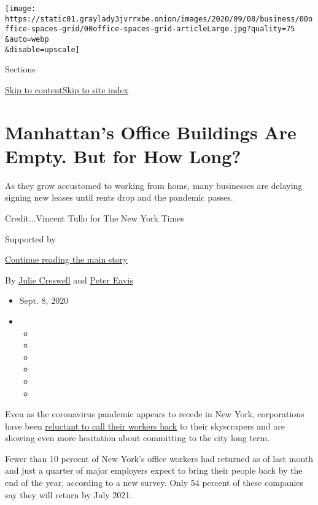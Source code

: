 \texttt{[image: https://static01.graylady3jvrrxbe.onion/images/2020/09/08/business/00office-spaces-grid/00office-spaces-grid-articleLarge.jpg?quality=75\\\&auto=webp\\\&disable=upscale]}

Sections

\protect\hyperlink{site-content}{Skip to
content}\protect\hyperlink{site-index}{Skip to site index}

\hypertarget{manhattans-office-buildings-are-empty-but-for-how-long}{%
\section{Manhattan's Office Buildings Are Empty. But for How
Long?}\label{manhattans-office-buildings-are-empty-but-for-how-long}}

As they grow accustomed to working from home, many businesses are
delaying signing new leases until rents drop and the pandemic passes.

Credit...Vincent Tullo for The New York Times

Supported by

\protect\hyperlink{after-sponsor}{Continue reading the main story}

By \href{https://www.nytimes3xbfgragh.onion/by/julie-creswell}{Julie
Creswell} and
\href{https://www.nytimes3xbfgragh.onion/by/peter-eavis}{Peter Eavis}

\begin{itemize}
\item
  Sept. 8, 2020
\item
  \begin{itemize}
  \item
  \item
  \item
  \item
  \item
  \item
  \end{itemize}
\end{itemize}

Even as the coronavirus pandemic appears to recede in New York,
corporations have been
\href{https://www.nytimes3xbfgragh.onion/2020/06/22/nyregion/nyc-phase-2-reopening-coronavirus.html}{reluctant
to call their workers back} to their skyscrapers and are showing even
more hesitation about committing to the city long term.

Fewer than 10 percent of New York's office workers had returned as of
last month and just a quarter of major employers expect to bring their
people back by the end of the year, according to a new survey. Only 54
percent of these companies say they will return by July 2021.

